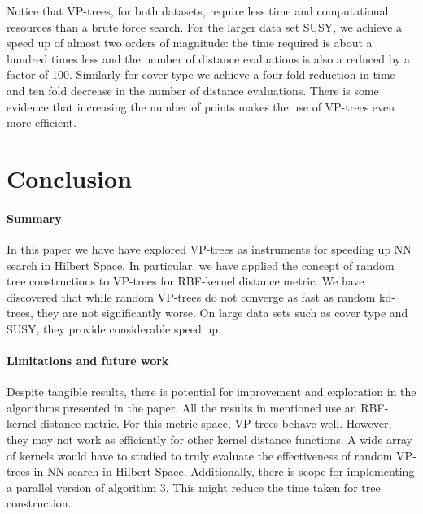 \documentclass[11pt]{article}
\begin{document}
Notice that VP-trees, for both datasets, require less time and computational resources than a brute force search. For the larger data set SUSY, we achieve a speed up of almost two orders of magnitude: the time required is about a hundred times less and the number of distance evaluations is also a reduced by a factor of 100. Similarly for cover type we achieve a four fold reduction in time and ten fold decrease in the number of distance evaluations. There is some evidence that increasing the number of points makes the use of VP-trees even more efficient.~\cite{Nayar08}

\section{Conclusion}
\paragraph{Summary} In this paper we have have explored VP-trees as instruments for speeding up NN search in Hilbert Space. In particular, we have applied the concept of random tree constructions to VP-trees for RBF-kernel distance metric. We have discovered that while random VP-trees do not converge as fast as random kd-trees, they are not significantly worse. On large data sets such as cover type and SUSY, they provide considerable speed up.

\paragraph{Limitations and future work} Despite tangible results, there is potential for improvement and exploration in the algorithms presented in the paper. All the results in mentioned use an RBF-kernel distance metric. For this metric space, VP-trees behave well. However, they may not work as efficiently for other kernel distance functions. A wide array of kernels would have to studied to truly evaluate the effectiveness of random VP-trees in NN search in Hilbert Space. Additionally, there is scope for implementing a parallel version of algorithm 3. This might reduce the time taken for tree construction. 
\pagebreak
{}

\end{document}
